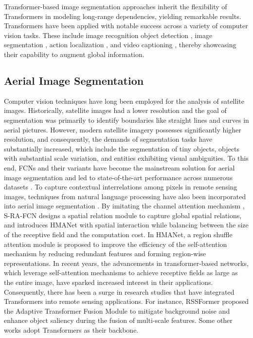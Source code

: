 \documentclass[journal]{IEEEtran}
\begin{document}
Transformer-based image segmentation approaches \cite{cheng2021per, strudel2021segmenter, zheng2021rethinking, xie2021segformer, tran2022aisformer, cheng2022masked} 
inherit the flexibility of Transformers in modeling long-range dependencies, yielding remarkable results. 
Transformers have been applied with notable success across a variety of computer vision tasks. These include image recognition \cite{dosovitskiy2020image, touvron2021training} object detection \cite{carion2020end, zhu2020deformable, sun2021sparse}, image segmentation \cite{ye2019cross, zheng2021rethinking, tran2022aisformer}, action localization \cite{vo2021aei, vo2022aoe}, and video captioning \cite{yamazaki2022vlcap, yamazaki2022vltint}, thereby showcasing their capability to augment global information.




\subsection{Aerial Image Segmentation}
Computer vision techniques have long been employed for the analysis of satellite images. 
Historically, satellite images had a lower resolution and the goal of segmentation was primarily to identify boundaries like straight lines and curves in aerial pictures. However, modern satellite imagery possesses significantly higher resolution, and consequently, the demands of segmentation tasks have substantially increased, which include the segmentation of tiny objects, objects with substantial scale variation, and entities exhibiting visual ambiguities.
To this end, FCNs and their variants have become the mainstream solution for aerial image segmentation and led to state-of-the-art performance across numerous datasets \cite{chen2018encoder, sun2019deep, li2021pointflow, xue2022aanet, factseg2022, hou2022bsnet}.
To capture contextual interrelations among pixels in remote sensing images, techniques from natural language processing have also been incorporated into aerial image segmentation \cite{you2019pixel}.
By imitating the channel attention mechanism \cite{hu2018squeeze}, S-RA-FCN \cite{mou2020relation} designs a spatial relation module to capture global spatial relations, and \cite{niu2021hybrid} introduces HMANet with spatial interaction while balancing between the size of the receptive field and the computation cost. In HMANet, a region shuffle attention module is proposed to improve the efficiency of the self-attention mechanism by reducing redundant features and forming region-wise representations. 
In recent years, the advancements in transformer-based networks, which leverage self-attention mechanisms to achieve receptive fields as large as the entire image, have sparked increased interest in their applications. 
Consequently, there has been a surge in research studies 
\cite{wang2022empirical, wang2022novel, xu2023rssformer, xie2021segformer, wang2022unetformer, chen2021transunet, sun2022ringmo} 
that have integrated Transformers into remote sensing applications. For instance, 
RSSFormer \cite{xu2023rssformer} proposed the Adaptive Transformer Fusion Module to mitigate background noise and enhance object saliency during the fusion of multi-scale features. Some other works \cite{wang2022novel, sun2022ringmo} adopt Transformers as their backbone.  
\end{document}
